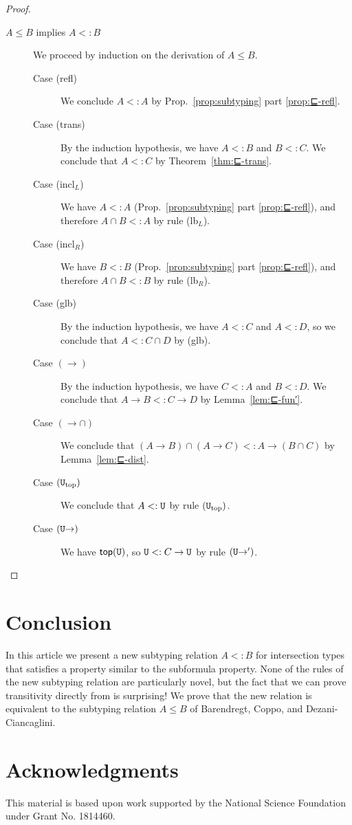 \documentclass{article}
\begin{document}
\begin{proof}
\begin{description}
  \item[$A \leq B$ implies $A <: B$]
    We proceed by induction on the derivation of $A \leq B$.
    \begin{description}
    \item[Case (refl)] We conclude $A <: A$ by Prop.~\ref{prop:subtyping}
      part \ref{prop:⊑-refl}.
    \item[Case (trans)]
      By the induction hypothesis, we have $A <: B$ and $B <: C$.
      We conclude that $A <: C$ by Theorem~\ref{thm:⊑-trans}.
    \item[Case (incl$_L$)] We have $A <: A$
      (Prop.~\ref{prop:subtyping} part \ref{prop:⊑-refl}),
      and therefore $A \cap B <: A$ by rule (lb$_L$).
    \item[Case (incl$_R$)] We have $B <: B$
      (Prop.~\ref{prop:subtyping} part \ref{prop:⊑-refl}),
      and therefore $A \cap B <: B$ by rule (lb$_R$).
    \item[Case (glb)] By the induction hypothesis, we have
      $A <: C$ and $A <: D$, so we conclude that $A <: C \cap D$ by (glb).
    \item[Case $(\to)$] By the induction hypothesis, we have $C <: A$
      and $B <: D$. We conclude that $A \to B <: C \to D$
      by Lemma~\ref{lem:⊑-fun′}.
    \item[Case $({\to}{\cap})$] We conclude that
      $(A \to B) \cap (A \to C) <: A \to (B \cap C)$
      by Lemma~\ref{lem:⊑-dist}.
    \item[Case $(\mathtt{U}_{\mathrm{top}})$]
      We conclude that $A <: \mathtt{U}$ by rule $(\mathtt{U}_{\mathrm{top}})$.
    \item[Case $(\mathtt{U}{\to})$]
      We have $\mathsf{top}(\mathtt{U})$, so $\mathtt{U} <: C \to \mathtt{U}$ by rule $(\mathtt{U}{\to}')$.
    \end{description}
    
  \end{description}
\end{proof}

\section{Conclusion}
\label{sec:conclude}

In this article we present a new subtyping relation $A <: B$ for
intersection types that satisfies a property similar to the subformula
property.  None of the rules of the new subtyping relation are
particularly novel, but the fact that we can prove transitivity
directly from is surprising!  We prove that the new relation is
equivalent to the subtyping relation $A \leq B$ of Barendregt, Coppo,
and Dezani-Ciancaglini.


\section*{Acknowledgments}

This material is based upon work supported by the National Science
Foundation under Grant No. 1814460.

\pagebreak



\end{document}
